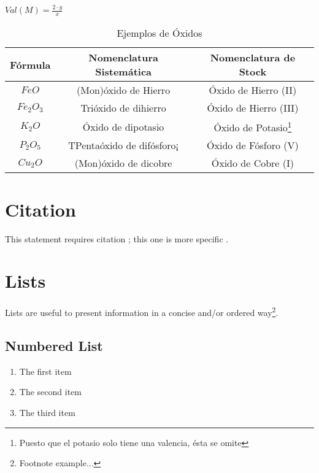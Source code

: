 \documentclass[11pt,fleqn]{book} %
\begin{document}
\begin{center}
		$Val(M)= \frac{2\cdot y}{x}$
\end{center}

\begin{table}[h!]
	\centering
	\begin{tabular}{c|cc}
		Fórmula&Nomenclatura Sistemática&Nomenclatura de Stock\\ \hline
		$FeO$&(Mon)óxido de Hierro&Óxido de Hierro (II)\\
		$Fe_{2}O_{3}$&Trióxido de dihierro&Óxido de Hierro (III)\\
		$K_{2}O$&Óxido de dipotasio&Óxido de Potasio\footnote{Puesto que el potasio solo tiene una valencia, ésta se omite }\\
		$P_{2}O_{5}$&TPentaóxido de difósforo¡&Óxido de Fósforo (V)\\
		$Cu_{2}O$&(Mon)óxido de dicobre&Óxido de Cobre (I)\\ \hline
	\end{tabular}
	\caption{Ejemplos de Óxidos}
\end{table}
	

\section{Citation}

This statement requires citation \cite{book_key}; this one is more specific \cite[122]{article_key}.


\section{Lists}

Lists are useful to present information in a concise and/or ordered way\footnote{Footnote example...}.

\subsection{Numbered List}

\begin{enumerate}
\item The first item
\item The second item
\item The third item
\end{enumerate}
\end{document}
